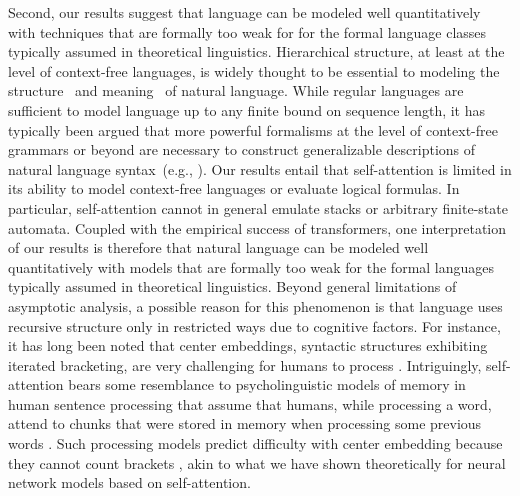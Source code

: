 \documentclass[11pt,a4paper]{article}
\begin{document}
Second, our results suggest that language can be modeled well quantitatively with techniques that are formally too weak for for the formal language classes typically assumed in theoretical linguistics.
Hierarchical structure, at least at the level of context-free languages, is widely thought to be essential to modeling the structure~\cite{everaert2015structures} and meaning~\cite{montague1973proper} of natural language.
While regular languages are sufficient to model language up to any finite bound on sequence length, it has typically been argued that more powerful formalisms at the level of context-free grammars or beyond are necessary to construct generalizable descriptions of natural language syntax~(e.g., \citet{chomsky1957syntactic,shieber1985evidence}).
Our results entail that self-attention is limited in its ability to model context-free languages or evaluate logical formulas.
In particular, self-attention cannot in general emulate stacks or arbitrary finite-state automata.
Coupled with the empirical success of transformers, one interpretation of our results is therefore that natural language can be modeled well quantitatively with models that are formally too weak for the formal languages typically assumed in theoretical linguistics.
Beyond general limitations of asymptotic analysis, a possible reason for this phenomenon is that language uses recursive structure only in restricted ways due to cognitive factors.
For instance, it has long been noted that center embeddings, syntactic structures exhibiting iterated bracketing, are very challenging for humans to process \cite{miller-finitary-1963,gibson1999memory}.
Intriguingly, self-attention bears some resemblance to psycholinguistic models of memory in human sentence processing that assume that humans, while processing a word, attend to chunks that were stored in memory when processing some previous words \cite{lewis2005activation,parker2017cue}.
Such processing models predict difficulty with center embedding because they cannot count brackets \cite{lewis2005activation}, akin to what we have shown theoretically for neural network models based on self-attention.






\end{document}
